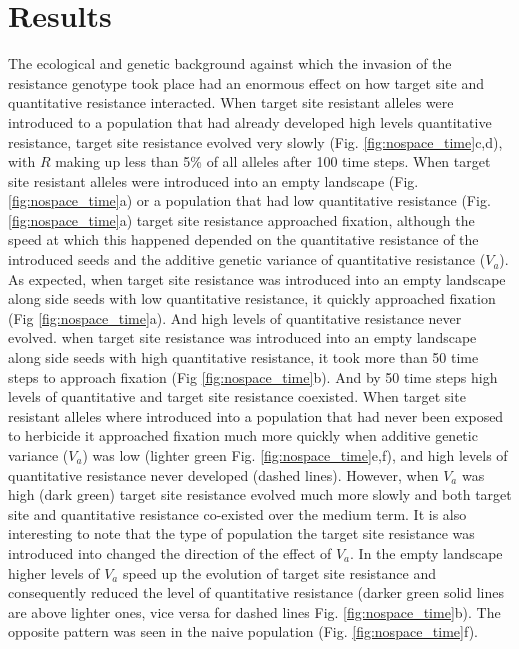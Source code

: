 \documentclass[10pt,letterpaper]{article}
\begin{document}
\section*{Results}
The ecological and genetic background against which the invasion of the resistance genotype took place had an enormous effect on how target site and quantitative resistance interacted. When target site resistant alleles were introduced to a population that had already developed high levels quantitative resistance, target site resistance evolved very slowly (Fig. \ref{fig:nospace_time}c,d), with $R$ making up less than 5\% of all alleles after 100 time steps. When target site resistant alleles were introduced into an empty landscape (Fig. \ref{fig:nospace_time}a) or a population that had low quantitative resistance (Fig. \ref{fig:nospace_time}a) target site resistance approached fixation, although the speed at which this happened depended on the quantitative resistance of the introduced seeds and the additive genetic variance of quantitative resistance ($V_a$). As expected, when target site resistance was introduced into an empty landscape along side seeds with low quantitative resistance, it quickly approached fixation (Fig \ref{fig:nospace_time}a). And high levels of quantitative resistance never evolved. when target site resistance was introduced into an empty landscape along side seeds with high quantitative resistance, it took more than 50 time steps to approach fixation (Fig \ref{fig:nospace_time}b). And by 50 time steps high levels of quantitative and target site resistance coexisted. When target site resistant alleles where introduced into a population that had never been exposed to herbicide it approached fixation much more quickly when additive genetic variance ($V_a$) was low (lighter green Fig. \ref{fig:nospace_time}e,f), and high levels of quantitative resistance never developed (dashed lines). However, when $V_a$ was high (dark green) target site resistance evolved much more slowly and both target site and quantitative resistance co-existed over the medium term. It is also interesting to note that the type of population the target site resistance was introduced into changed the direction of the effect of $V_a$. In the empty landscape higher levels of $V_a$ speed up the evolution of target site resistance and consequently reduced the level of quantitative resistance (darker green solid lines are above lighter ones, vice versa for dashed lines Fig. \ref{fig:nospace_time}b). The opposite pattern was seen in the naive population (Fig. \ref{fig:nospace_time}f).  
\end{document}

